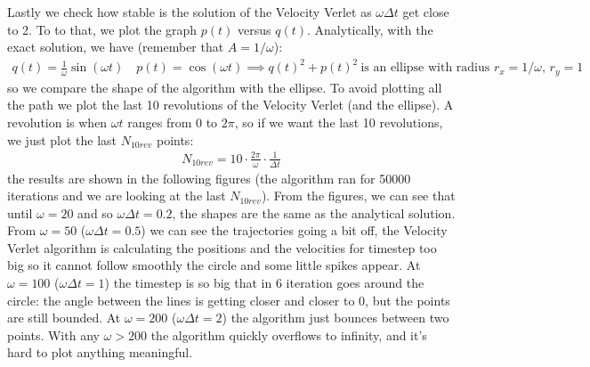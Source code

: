 \documentclass[../main.tex]{subfiles}
\begin{document}
Lastly we check how stable is the solution of the Velocity Verlet as $\omega\Delta t$ get close to 2. To to that, we plot the graph $p(t)$ versus $q(t)$. Analytically, with the exact solution, we  have (remember that $A = 1/\omega$):
\begin{align}
    q(t) = \frac{1}{\omega}\sin(\omega t)\quad p(t) = \cos(\omega t)
    \implies  q(t)^2 + p(t)^2\ \text{is an ellipse with radius } r_x=1/\omega \text{, } r_y = 1
\end{align}so we compare the shape of the algorithm with the ellipse. To avoid plotting all the path we plot the last 10 revolutions of the Velocity Verlet (and the ellipse). A revolution is when $\omega t$ ranges from 0 to $2\pi$, so if we want the last 10 revolutions, we just plot the last $N_{10rev}$ points:
\begin{align}
    N_{10rev} = 10 \cdot \frac{2\pi}{\omega} \cdot \frac{1}{\Delta t}
\end{align} the results are shown in the following figures (the algorithm ran for 50000 iterations and we are looking at the last $N_{10rev}$). From the figures, we can see that until $\omega=20$ and so $\omega\Delta t = 0.2$, the shapes are the same as the analytical solution. From $\omega=50$  ($\omega\Delta t=0.5$) we can see the trajectories going a bit off, the Velocity Verlet algorithm is calculating the positions and the velocities for timestep too big so it cannot follow smoothly  the circle and some little spikes appear. At $\omega=100$  ($\omega\Delta t=1$) the timestep is so big that in 6 iteration goes around the circle: the angle between the lines is getting closer and closer to 0, but the points are still bounded. At $\omega=200$ ($\omega\Delta t = 2$) the algorithm just bounces between two points. With any $\omega > 200$ the algorithm quickly overflows to infinity, and it's hard to plot anything meaningful.
\end{document}

